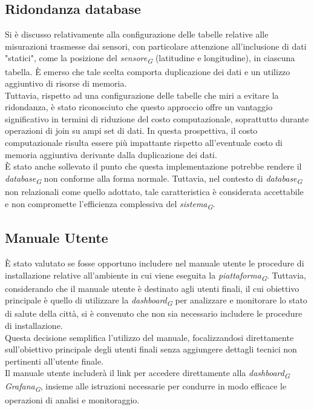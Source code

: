 \documentclass{article}
\begin{document}
    \subsection{Ridondanza database}
    Si è discusso relativamente alla configurazione delle tabelle relative alle misurazioni trasmesse dai sensori, con particolare attenzione all'inclusione di dati "statici", come la posizione del \textit{sensore}\textsubscript{\textit{G}} (latitudine e longitudine), in ciascuna tabella. È emerso che tale scelta comporta duplicazione dei dati e un utilizzo aggiuntivo di risorse di memoria. \\
    Tuttavia, rispetto ad una configurazione delle tabelle che miri a evitare la ridondanza, è stato riconosciuto che questo approccio offre un vantaggio significativo in termini di riduzione del costo computazionale, soprattutto durante operazioni di join su ampi set di dati. In questa prospettiva, il costo computazionale risulta essere più impattante rispetto all'eventuale costo di memoria aggiuntiva derivante dalla duplicazione dei dati. \\
    È stato anche sollevato il punto che questa implementazione potrebbe rendere il \textit{database}\textsubscript{\textit{G}} non conforme alla forma normale. Tuttavia, nel contesto di \textit{database}\textsubscript{\textit{G}} non relazionali come quello adottato, tale caratteristica è considerata accettabile e non compromette l'efficienza complessiva del \textit{sistema}\textsubscript{\textit{G}}.


    \subsection{Manuale Utente}
    È stato valutato se fosse opportuno includere nel manuale utente le procedure di installazione relative all'ambiente in cui viene eseguita la \textit{piattaforma}\textsubscript{\textit{G}}. Tuttavia, considerando che il manuale utente è destinato agli utenti finali, il cui obiettivo principale è quello di utilizzare la \textit{dashboard}\textsubscript{\textit{G}} per analizzare e monitorare lo stato di salute della città, si è convenuto che non sia necessario includere le procedure di installazione. \\
    Questa decisione semplifica l'utilizzo del manuale, focalizzandosi direttamente sull'obiettivo principale degli utenti finali senza aggiungere dettagli tecnici non pertinenti all'utente finale. \\
    Il manuale utente includerà il link per accedere direttamente alla \textit{dashboard}\textsubscript{\textit{G}} \textit{Grafana}\textsubscript{\textit{G}}, insieme alle istruzioni necessarie per condurre in modo efficace le operazioni di analisi e monitoraggio.
\end{document}
